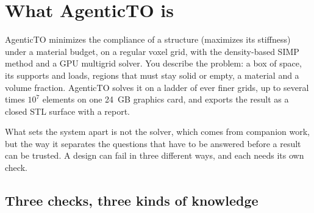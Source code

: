\chapter{What AgenticTO is}\label{ch:overview}

AgenticTO minimizes the compliance of a structure (maximizes its stiffness) under a material budget, on a regular voxel
grid, with the density-based SIMP method and a GPU multigrid solver. You describe the problem: a box of space, its
supports and loads, regions that must stay solid or empty, a material and a volume fraction. AgenticTO solves it on a
ladder of ever finer grids, up to several times $10^7$ elements on one 24~GB graphics card, and exports the result as a
closed STL surface with a report.

What sets the system apart is not the solver, which comes from companion work, but the way it separates the questions
that have to be answered before a result can be trusted. A design can fail in three different ways, and each needs its
own check.

\section{Three checks, three kinds of knowledge}\label{sec:threechecks}

